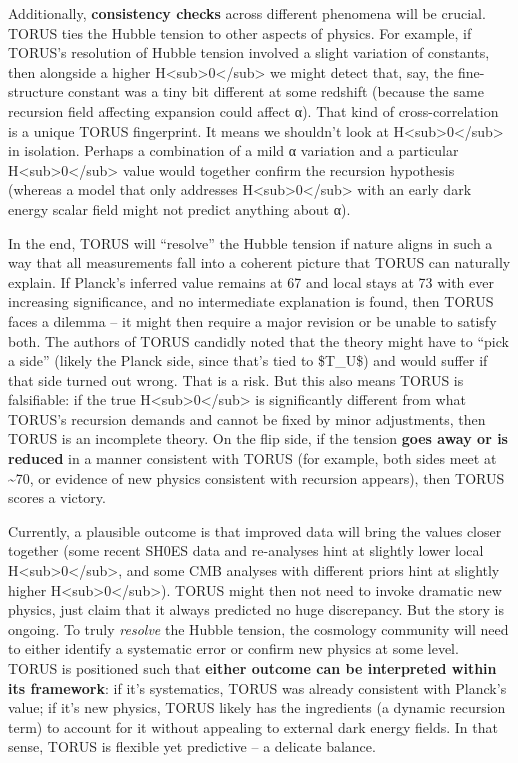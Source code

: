 \documentclass[
]{article}
\begin{document}
Additionally, \textbf{consistency checks} across different phenomena
will be crucial. TORUS ties the Hubble tension to other aspects of
physics. For example, if TORUS's resolution of Hubble tension involved a
slight variation of constants, then alongside a higher
H\textless sub\textgreater0\textless/sub\textgreater{} we might detect
that, say, the fine-structure constant was a tiny bit different at some
redshift (because the same recursion field affecting expansion could
affect α). That kind of cross-correlation is a unique TORUS fingerprint.
It means we shouldn't look at
H\textless sub\textgreater0\textless/sub\textgreater{} in isolation.
Perhaps a combination of a mild α variation and a particular
H\textless sub\textgreater0\textless/sub\textgreater{} value would
together confirm the recursion hypothesis (whereas a model that only
addresses H\textless sub\textgreater0\textless/sub\textgreater{} with an
early dark energy scalar field might not predict anything about α).

In the end, TORUS will ``resolve'' the Hubble tension if nature aligns
in such a way that all measurements fall into a coherent picture that
TORUS can naturally explain. If Planck's inferred value remains at 67
and local stays at 73 with ever increasing significance, and no
intermediate explanation is found, then TORUS faces a dilemma -- it
might then require a major revision or be unable to satisfy both. The
authors of TORUS candidly noted that the theory might have to ``pick a
side'' (likely the Planck side, since that's tied to \$T\_U\$) and would
suffer if that side turned out wrong\hspace{0pt}. That is a risk. But
this also means TORUS is falsifiable: if the true
H\textless sub\textgreater0\textless/sub\textgreater{} is significantly
different from what TORUS's recursion demands and cannot be fixed by
minor adjustments, then TORUS is an incomplete theory. On the flip side,
if the tension \textbf{goes away or is reduced} in a manner consistent
with TORUS (for example, both sides meet at \textasciitilde70, or
evidence of new physics consistent with recursion appears), then TORUS
scores a victory\hspace{0pt}.

Currently, a plausible outcome is that improved data will bring the
values closer together (some recent SH0ES data and re-analyses hint at
slightly lower local
H\textless sub\textgreater0\textless/sub\textgreater, and some CMB
analyses with different priors hint at slightly higher
H\textless sub\textgreater0\textless/sub\textgreater). TORUS might then
not need to invoke dramatic new physics, just claim that it always
predicted no huge discrepancy. But the story is ongoing. To truly
\emph{resolve} the Hubble tension, the cosmology community will need to
either identify a systematic error or confirm new physics at some level.
TORUS is positioned such that \textbf{either outcome can be interpreted
within its framework}: if it's systematics, TORUS was already consistent
with Planck's value; if it's new physics, TORUS likely has the
ingredients (a dynamic recursion term) to account for it without
appealing to external dark energy fields. In that sense, TORUS is
flexible yet predictive -- a delicate balance.
\end{document}
